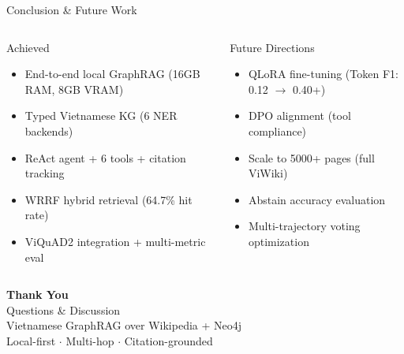 \documentclass[aspectratio=169]{beamer}
\begin{document}
\begin{frame}{Conclusion \& Future Work}
\begin{columns}[T]
\begin{exampleblock}{Achieved}
\begin{itemize}
  \item End-to-end local GraphRAG (16GB RAM, 8GB VRAM)
  \item Typed Vietnamese KG (6 NER backends)
  \item ReAct agent + 6 tools + citation tracking
  \item WRRF hybrid retrieval (64.7\% hit rate)
  \item ViQuAD2 integration + multi-metric eval
\end{itemize}
\end{exampleblock}

\begin{alertblock}{Future Directions}
\begin{itemize}
  \item QLoRA fine-tuning (Token F1: 0.12 $\rightarrow$ 0.40+)
  \item DPO alignment (tool compliance)
  \item Scale to 5000+ pages (full ViWiki)
  \item Abstain accuracy evaluation
  \item Multi-trajectory voting optimization
\end{itemize}
\end{alertblock}
\end{columns}
\end{frame}

\begin{frame}[plain]
\begin{center}
\vspace{2cm}
{\Huge \textbf{Thank You}}\\[1em]
{\Large Questions \& Discussion}\\[2em]
{\normalsize Vietnamese GraphRAG over Wikipedia + Neo4j}\\[0.5em]
{\small \textcolor{neutral}{Local-first $\cdot$ Multi-hop $\cdot$ Citation-grounded}}
\end{center}
\end{frame}

\appendix
\end{document}
